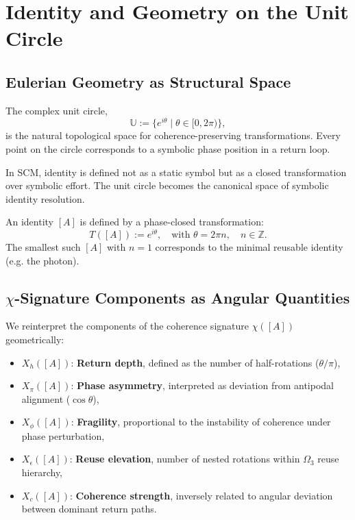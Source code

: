 \chapter{Identity and Geometry on the Unit Circle} \label{chapter:identity-geometry}

\section{Eulerian Geometry as Structural Space}

The complex unit circle,
\[
\mathbb{U} := \{ e^{i\theta} \mid \theta \in [0, 2\pi) \},
\]
is the natural topological space for coherence-preserving transformations. Every point on the circle corresponds to a symbolic phase position in a return loop.

In SCM, identity is defined not as a static symbol but as a closed transformation over symbolic effort. The unit circle becomes the canonical space of symbolic identity resolution.

\begin{definition}
An identity $[A]$ is defined by a phase-closed transformation:
\[
T([A]) := e^{i\theta}, \quad \text{with } \theta = 2\pi n, \quad n \in \mathbb{Z}.
\]
The smallest such $[A]$ with $n=1$ corresponds to the minimal reusable identity (e.g. the photon).
\end{definition}

\section{$\chi$-Signature Components as Angular Quantities}

We reinterpret the components of the coherence signature $\chi([A])$ geometrically:

\begin{itemize}
    \item $X_h([A])$: \textbf{Return depth}, defined as the number of half-rotations ($\theta/\pi$),
    \item $X_\pi([A])$: \textbf{Phase asymmetry}, interpreted as deviation from antipodal alignment ($\cos \theta$),
    \item $X_\phi([A])$: \textbf{Fragility}, proportional to the instability of coherence under phase perturbation,
    \item $X_\epsilon([A])$: \textbf{Reuse elevation}, number of nested rotations within $\Omega_3$ reuse hierarchy,
    \item $X_c([A])$: \textbf{Coherence strength}, inversely related to angular deviation between dominant return paths.
\end{itemize}

